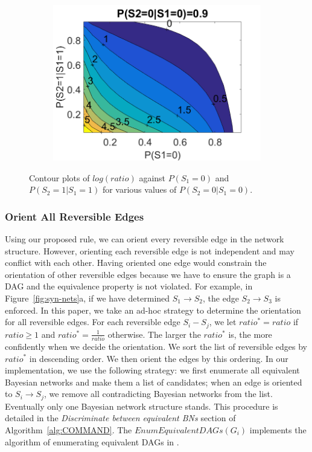\documentclass{edm_template}
\newcommand{\hl}[1]{\colorbox{yellow}{#1}}
\begin{document}
\begin{figure}[!ht]
\begin{subfigure}[t]{0.32\linewidth}
				\includegraphics[width=1.05\linewidth]{figures/contour3.png}
				\caption{\label{fig:contour3}}
			\end{subfigure}						
			\caption{Contour plots of $log(ratio)$ against $P(S_1=0)$ and $P(S_2=1|S_1=1)$ for various values of $P(S_2=0|S_1=0)$.\label{fig:contours} }
			\vspace{-1em}
		\end{figure}
		
\subsubsection{Orient All Reversible Edges}
Using our proposed rule, we can orient every reversible edge in the network structure. 
However, orienting each reversible edge is not independent and may conflict with each other.
Having oriented one edge would constrain the orientation of other reversible edges because we have to ensure the graph is a DAG and the equivalence property is not violated.
For example, in Figure~\ref{fig:syn-nets}a, if we have determined $S_1\rightarrow S_2$, the edge $S_2\rightarrow S_3$ is enforced.
In this paper, we take an ad-hoc strategy to determine the orientation for all reversible edges. 
For each reversible edge $S_i-S_j$, we let $ratio^*=ratio$ if $ratio \ge 1$ and $ratio^*=\frac{1}{ratio}$ otherwise. 
The larger the $ratio^*$ is, the more confidently when we decide the orientation.
We sort the list of reversible edges by $ratio^*$ in descending order. We then orient the edges by this ordering.
In our implementation, we use the following strategy: 
we first enumerate all equivalent Bayesian networks and make them a list of candidates; 
when an edge is oriented to $S_i\rightarrow S_j$, we remove all contradicting Bayesian networks from the list.
Eventually only one Bayesian network structure stands. This procedure is detailed in the \emph{Discriminate between equivalent BNs} section of Algorithm~\ref{alg:COMMAND}.  
The $EnumEquivalentDAGs(G_i)$ implements the algorithm of enumerating equivalent DAGs in \cite{chen2014finding}.
\end{document}
